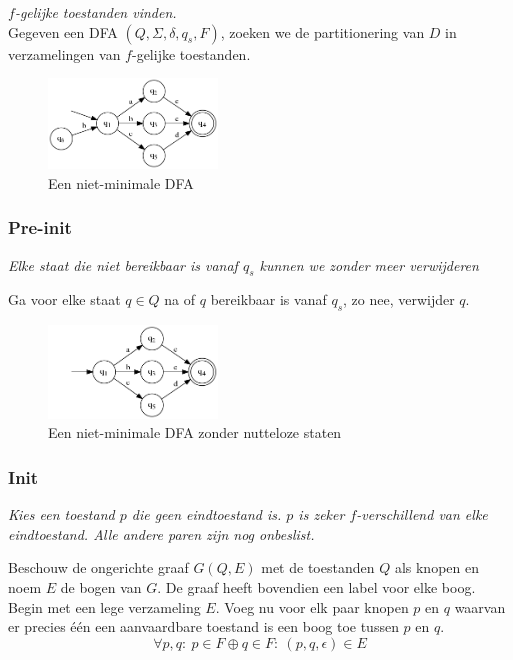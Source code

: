 \documentclass[main.tex]{subfiles}
\begin{document}
\begin{al}
  \label{al:dfa-minimalisatie}
  \emph{$f$-gelijke toestanden vinden.}\\
  Gegeven een DFA $(Q,\Sigma,\delta,q_{s},F)$, zoeken we de partitionering van $D$ in verzamelingen van $f$-gelijke toestanden.

  \begin{figure}[H]
    \centering
    \includegraphics[width=0.4\textwidth]{assets/dfa_minimalisatie-1.png}     
    \caption{Een niet-minimale DFA}
    \label{fig:dfa-minimalisatie-1}
  \end{figure}

  \subsubsection{Pre-init}
  \textit{
    Elke staat die niet bereikbaar is vanaf $q_s$ kunnen we zonder meer verwijderen
  }

  Ga voor elke staat $q\in Q$ na of $q$ bereikbaar is vanaf $q_{s}$, zo nee, verwijder $q$.

  \begin{figure}[H]
    \centering
    \includegraphics[width=0.4\textwidth]{assets/dfa_minimalisatie-2.png}     
    \caption{Een niet-minimale DFA zonder nutteloze staten}
    \label{fig:dfa-minimalisatie-2}
  \end{figure}

  \subsubsection{Init}
  \textit{
    Kies een toestand $p$ die geen eindtoestand is.
    $p$ is zeker $f$-verschillend van elke eindtoestand.
    Alle andere paren zijn nog onbeslist.
  }

  Beschouw de ongerichte graaf $G(Q,E)$ met de toestanden $Q$ als knopen en noem $E$ de bogen van $G$.
  De graaf heeft bovendien een label voor elke boog.
  Begin met een lege verzameling $E$.
  Voeg nu voor elk paar knopen $p$ en $q$ waarvan er precies \'e\'en een aanvaardbare toestand is een boog toe tussen $p$ en $q$.
  \[ \forall p,q:\ p \in F \oplus q \in F:\ (p,q,\epsilon) \in E \]


\end{al}
\end{document}
